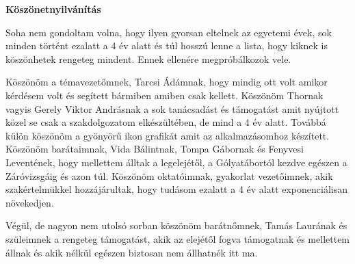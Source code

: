 
\thispagestyle{empty}

\vspace*{\fill}

{\bf \huge {Köszönetnyilvánítás}}

\vspace*{\fill}

Soha nem gondoltam volna, hogy ilyen gyorsan eltelnek az egyetemi évek, sok minden történt ezalatt a 4 év alatt és túl hosszú lenne a lista, hogy kiknek is köszönhetek rengeteg mindent. Ennek ellenére megpróbálkozok vele.

Köszönöm a témavezetőmnek, Tarcsi Ádámnak, hogy mindig ott volt amikor kérdésem volt és segített bármiben amiben csak kellett.
Köszönöm Thornak vagyis Gerely Viktor Andrásnak a sok tanácsadást és támogatást amit nyújtott közel se csak a szakdolgozatom elkészültében, de mind a 4 év alatt. Továbbá külön köszönöm a gyönyörű ikon grafikát amit az alkalmazásomhoz készített.
Köszönöm barátaimnak, Vida Bálintnak, Tompa Gábornak és Fenyvesi Leventének, hogy mellettem álltak a legelejétől, a Gólyatábortól kezdve egészen a Záróvizsgáig és azon túl.
Köszönöm oktatóimnak, gyakorlat vezetőimnek, akik szakértelmükkel hozzájárultak, hogy tudásom ezalatt a 4 év alatt exponenciálisan növekedjen.

Végül, de nagyon nem utolsó sorban köszönöm barátnőmnek, Tamás Laurának és szüleimnek a rengeteg támogatást, akik az elejétől fogva támogatnak és mellettem állnak és akik nélkül egészen biztosan nem állhatnék itt ma.

\vspace*{\fill}
